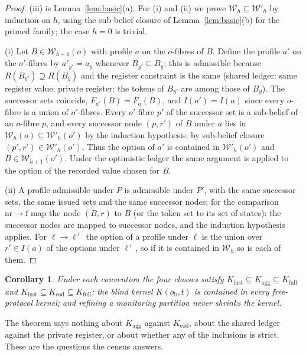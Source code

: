 \documentclass[11pt,a4paper]{article}
\theoremstyle{plain}
\newtheorem{corollary}[theorem]{Corollary}
\theoremstyle{definition}
\theoremstyle{remark}
\newcommand{\calW}{\mathcal{W}}
\newcommand{\led}{\ell}
\newcommand{\opt}{\ell^{+}}
\newcommand{\free}{\mathrm{f}}
\newcommand{\nr}{\mathrm{nr}}
\newcommand{\oblind}{o_{\mathrm{b}}}
\newcommand{\Kinst}{K_{\mathrm{inst}}}
\newcommand{\Kagg}{K_{\mathrm{agg}}}
\newcommand{\Kcod}{K_{\mathrm{cod}}}
\newcommand{\Kfull}{K_{\mathrm{full}}}
\begin{document}
\begin{proof}
(iii) is Lemma~\ref{lem:basic}(a). For (i) and (ii) we prove $\calW_h\subseteq\calW'_h$ by induction on $h$, using the sub-belief closure of Lemma~\ref{lem:basic}(b) for the primed family; the case $h=0$ is trivial.

(i) Let $B\in\calW_{h+1}(o)$ with profile $a$ on the $o$-fibres of $B$. Define the profile $a'$ on the $o'$-fibres by $a'_{y'}=a_y$ whenever $B_{y'}\subseteq B_y$; this is admissible because $R(B_{y'})\supseteq R(B_y)$ and the register constraint is the same (shared ledger: same register value; private register: the tokens of $B_{y'}$ are among those of $B_y$). The successor sets coincide, $F_{a'}(B)=F_a(B)$, and $I(a')=I(a)$ since every $o$-fibre is a union of $o'$-fibres. Every $o'$-fibre $p'$ of the successor set is a sub-belief of an $o$-fibre $p$, and every successor node $(p,r')$ of $B$ under $a$ lies in $\calW_h(o)\subseteq\calW'_h(o')$ by the induction hypothesis; by sub-belief closure $(p',r')\in\calW'_h(o')$. Thus the option of $a'$ is contained in $\calW'_h(o')$ and $B\in\calW_{h+1}(o')$. Under the optimistic ledger the same argument is applied to the option of the recorded value chosen for $B$.

(ii) A profile admissible under $P$ is admissible under $P'$, with the same successor sets, the same issued sets and the same successor nodes; for the comparison $\nr\to\free$ map the node $(B,r)$ to $B$ (or the token set to its set of states): the successor nodes are mapped to successor nodes, and the induction hypothesis applies. For $\led\to\opt$ the option of a profile under $\led$ is the union over $r'\in I(a)$ of the options under $\opt$, so if it is contained in $\calW_h$ so is each of them.
\end{proof}

\begin{corollary}\label{cor:order}
Under each convention the four classes satisfy $\Kinst\subseteq\Kagg\subseteq\Kfull$ and $\Kinst\subseteq\Kcod\subseteq\Kfull$; the blind kernel $K(\oblind,\free)$ is contained in every free-protocol kernel; and refining a monitoring partition never shrinks the kernel.
\end{corollary}

The theorem says nothing about $\Kagg$ against $\Kcod$, about the shared ledger against the private register, or about whether any of the inclusions is strict. These are the questions the census answers.
\end{document}
